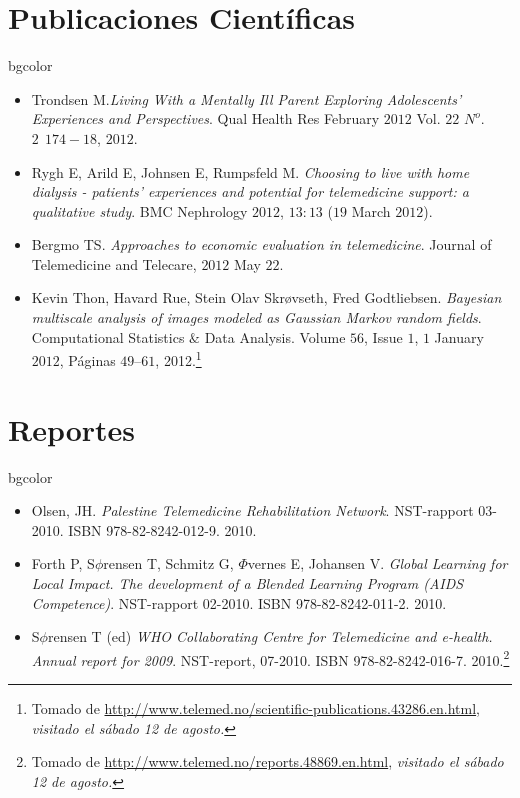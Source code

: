 \documentclass[xcolor=svgnames]{beamer}
\begin{document}
\section{Publicaciones Científicas}
\begin{frame}
\begin{beamercolorbox}[rounded=true, center, shadow=true]{bgcolor}
  \begin{itemize}
   \item Trondsen M.\textit{Living With a Mentally Ill Parent Exploring Adolescents' Experiences and Perspectives}. Qual Health Res February $2012$ Vol. $22$ $N^o$. $2\ \ 174-18$, $2012$.
   \item Rygh E, Arild E, Johnsen E, Rumpsfeld M. \textit{Choosing to live with home dialysis - patients' experiences and potential for telemedicine support: a qualitative study}. BMC Nephrology $2012$, $13:13$ ($19$ March $2012$).
   \item Bergmo TS. \textit{Approaches to economic evaluation in telemedicine}. Journal of Telemedicine and Telecare, $2012$ May $22$.
   \item Kevin Thon, Havard Rue, Stein Olav Skrøvseth, Fred Godtliebsen. \textit{Bayesian multiscale analysis of images modeled as Gaussian Markov random fields}. Computational Statistics $\&$ Data Analysis. Volume $56$, Issue $1$, $1$ January $2012$, Páginas $49–61$, 2012.\footnote{Tomado de \url{http://www.telemed.no/scientific-publications.43286.en.html}, \textit{visitado el sábado 12 de agosto.}}
  \end{itemize}
\end{beamercolorbox}
\end{frame}

\section{Reportes}
\begin{frame}
\begin{beamercolorbox}[rounded=true, center, shadow=true]{bgcolor}
  \begin{itemize}
   \item Olsen, JH. \textit{Palestine Telemedicine Rehabilitation Network}. NST-rapport 03-2010. ISBN 978-82-8242-012-9. 2010.
   \item Forth P, S$\phi$rensen T, Schmitz G, $\Phi$vernes E, Johansen V. \textit{Global Learning for Local Impact. The development of a Blended Learning Program (AIDS Competence)}. NST-rapport 02-2010. ISBN 978-82-8242-011-2. 2010.
   \item S$\phi$rensen T (ed) \textit{WHO Collaborating Centre for Telemedicine and e-health. Annual report for 2009}. NST-report, 07-2010. ISBN 978-82-8242-016-7. 2010.\footnote{Tomado de \url{http://www.telemed.no/reports.48869.en.html}, \textit{visitado el sábado 12 de agosto.}}
  \end{itemize}
\end{beamercolorbox}
\end{frame}
\end{document}
